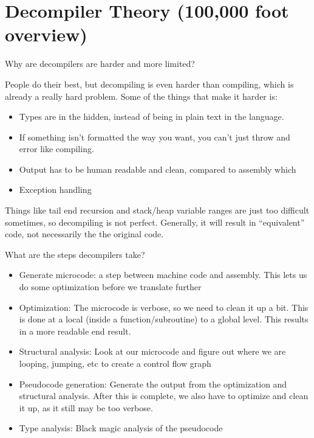 \documentclass{beamer}
\begin{document}
\section{Decompiler Theory (100,000 foot overview)}

\begin{frame}{Why are decompilers are harder and more limited?}

  People do their best, but decompiling is even harder than
  compiling, which is already a really hard problem. Some of the
  things that make it harder is:
  
  \begin{itemize}
    \item Types are in the hidden, instead of being in plain text in
      the language.
    \item If something isn't formatted the way you want, you can't
      just throw and error like compiling.
    \item Output has to be human readable and clean, compared to
      assembly which
    \item Exception handling
  \end{itemize}

  Things like tail end recursion and stack/heap variable ranges are
  just too difficult sometimes, so decompiling is not
  perfect. Generally, it will result in ``equivalent'' code, not
  necessarily the the original code.
\end{frame}

\begin{frame}{What are the steps decompilers take?}


  \begin{itemize}
    \item Generate microcode: a step between machine code and
      assembly. This lets us do some optimization before we translate
      further
    \item Optimization: The microcode is verbose, so we need to clean
      it up a bit. This is done at a local (inside a
      function/subroutine) to a global level. This results in a more
      readable end result.
    \item Structural analysis: Look at our microcode and figure out
      where we are looping, jumping, etc to create a control flow
      graph
    \item Pseudocode generation: Generate the output from the
      optimization and structural analysis. After this is complete, we
      also have to optimize and clean it up, as it still may be too
      verbose.
    \item Type analysis: Black magic analysis of the pseudocode
  \end{itemize}
\end{frame}
\end{document}
